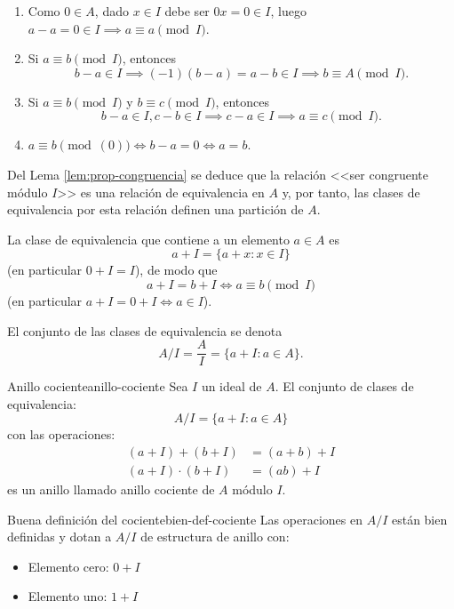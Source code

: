 \begin{proofbox}
    \begin{enumerate}
        \item Como $0 \in A$, dado $x \in I$ debe ser $0x = 0 \in I$, luego \(a - a = 0 \in I \implies a \equiv a \pmod{I}\).
        \item Si \(a \equiv b \pmod{I}\), entonces
        \[
        b - a \in I \implies (-1)(b-a) = a - b \in I \implies b \equiv A \pmod{I}.
        \]
        \item Si \(a \equiv b \pmod{I}\) y \(b \equiv c \pmod{I}\), entonces
        \[
        b - a \in I, c - b \in I \implies c - a \in I \implies a \equiv c \pmod{I}.
        \]
        \item \(a \equiv b \pmod{(0)} \iff b - a = 0 \iff a = b\).
    \end{enumerate}
\end{proofbox}

Del Lema \ref{lem:prop-congruencia} se deduce que la relación <<ser congruente módulo $I$>> es una relación de equivalencia en $A$ y, por tanto, las clases de equivalencia por esta relación definen una partición de $A$. 

La clase de equivalencia que contiene a un elemento $a \in A$ es
\[
a + I = \{a + x : x \in I\}
\]
(en particular $0 + I = I$), de modo que
\[
a + I = b + I \Leftrightarrow a \equiv b \pmod{I}
\]
(en particular $a + I = 0 + I \Leftrightarrow a \in I$). 

El conjunto de las clases de equivalencia se denota
\[
A/I = \frac{A}{I} = \{a + I : a \in A\}.
\]

\begin{definition}{Anillo cociente}{anillo-cociente}
    Sea \(I\) un ideal de \(A\). El conjunto de clases de equivalencia:
    \[
    A/I = \{a + I : a \in A\}
    \]
    con las operaciones:
    \begin{align*}
        (a + I) + (b + I) &= (a + b) + I \\
        (a + I) \cdot (b + I) &= (ab) + I
    \end{align*}
    es un anillo llamado {anillo cociente de \(A\) módulo \(I\)}.
\end{definition}

\begin{proposition}{Buena definición del cociente}{bien-def-cociente}
    Las operaciones en \(A/I\) están bien definidas y dotan a \(A/I\) de estructura de anillo con:
    \begin{itemize}
        \item Elemento cero: \(0 + I\)
        \item Elemento uno: \(1 + I\)
    \end{itemize}
\end{proposition}

